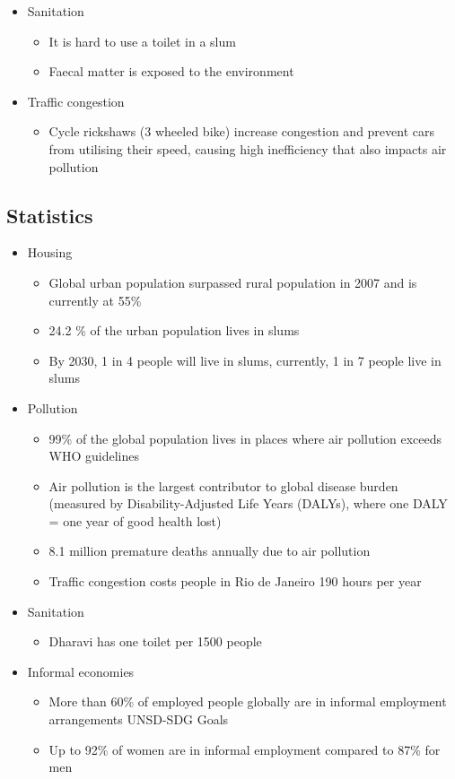 \begin{itemize}
		\item Sanitation
			\begin{itemize}
				\item It is hard to use a toilet in a slum
				\item Faecal matter is exposed to the environment
			\end{itemize}
		\item Traffic congestion
			\begin{itemize}
				\item Cycle rickshaws (3 wheeled bike) increase congestion and prevent cars from utilising their speed, causing high inefficiency that also impacts air pollution
			\end{itemize}
	\end{itemize}


	\subsection{Statistics}
		\begin{itemize}
			\item Housing
				\begin{itemize}
					\item Global urban population surpassed rural population in 2007 and is currently at 55\%
					\item 24.2 \% of the urban population lives in slums
					\item By 2030, 1 in 4 people will live in slums, currently, 1 in 7 people live in slums
				\end{itemize}

			\item Pollution
				\begin{itemize}
					\item 99\% of the global population lives in places where air pollution exceeds WHO guidelines
					\item Air pollution is the largest contributor to global disease burden (measured by Disability-Adjusted Life Years (DALYs), where one DALY = one year of good health lost)
					\item 8.1 million premature deaths annually due to air pollution
					\item Traffic congestion costs people in Rio de Janeiro 190 hours per year
				\end{itemize}
			\item Sanitation
				\begin{itemize}
					\item Dharavi has one toilet per 1500 people
				\end{itemize}
			\item Informal economies
				\begin{itemize}
					\item More than 60\% of employed people globally are in informal employment arrangements UNSD-SDG Goals
					\item Up to 92\% of women are in informal employment compared to 87\% for men
				\end{itemize}
		\end{itemize}

